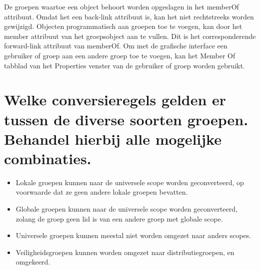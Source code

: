 De groepen waartoe een object behoort worden opgeslagen in het memberOf attribuut. Omdat het een back-link attribuut is, kan het niet rechtstreeks worden gewijzigd. Objecten programmatisch aan groepen toe te voegen, kan door het member attribuut van het groepsobject aan te vullen. Dit is het corresponderende forward-link attribuut van memberOf.
\npar
Om met de grafische interface een gebruiker of groep aan een andere groep toe te voegen, kan het Member Of tabblad van het Properties venster van de gebruiker of groep worden gebruikt.


\section{Welke conversieregels gelden er tussen de diverse soorten groepen. Behandel hierbij alle mogelijke combinaties.}

\begin{itemize}
\item Lokale groepen kunnen naar de universele scope worden geconverteerd, op voorwaarde dat ze geen andere lokale groepen bevatten.
\item Globale groepen kunnen naar de universele scope worden geconverteerd, zolang de groep geen lid is van een andere groep met globale scope.
\item Universele groepen kunnen meestal niet worden omgezet naar anders scopes.
\item Veiligheidsgroepen kunnen worden omgezet naar distributiegroepen, en omgekeerd.
\end{itemize}